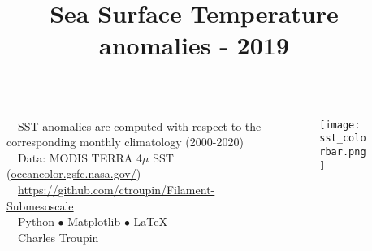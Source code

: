 \documentclass[11pt,a4paper,svgnames,draft]{beamer}
\title{Sea Surface Temperature\\ anomalies - 2019}
\begin{document}
\begin{columns}[T]
\begin{column}{2cm}

\end{column}

\begin{column}{.5\textwidth}

\begin{block}
\large
\faInfoCircle~~SST anomalies are computed with respect to the corresponding monthly climatology (2000-2020)\\ 
\faLink~~Data: MODIS TERRA 4$\mu$ SST (\url{oceancolor.gsfc.nasa.gov/})\\
\faGithub~~\url{https://github.com/ctroupin/Filament-Submesoscale}\\
\faWrench~~Python $\bullet$ Matplotlib $\bullet$ \LaTeX\\
\faCreativeCommons~~Charles Troupin


\end{block}

\end{column}

\begin{column}{.5\textwidth}

\begin{figure}
\centering
\texttt{[image: sst\_colorbar.png]}
\end{figure}
\end{column}
\end{columns}
\end{document}
